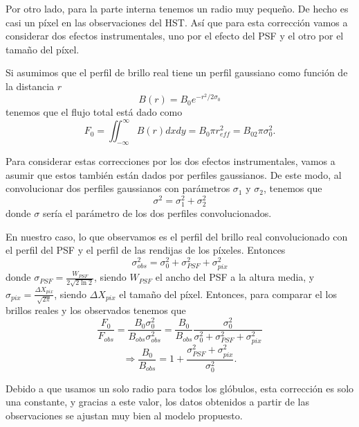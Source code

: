 \documentclass{book}
\begin{document}
Por otro lado, para la parte interna tenemos un radio muy pequeño. De hecho es casi un píxel en las observaciones del HST. Así que para esta corrección vamos a considerar dos efectos instrumentales, uno por el efecto del PSF y el otro por el tamaño del píxel.

Si asumimos que el perfil de brillo real tiene un perfil gaussiano como función de la distancia $r$ 
\begin{equation}
B(r)= B_0 e^{-r^2/2\sigma_0}
\end{equation} 
tenemos que el flujo total está dado como 
\begin{equation}
F_0=\iint_{-\infty}^\infty B(r)dxdy=B_0 \pi r_{eff}^2=B_02\pi \sigma_0^2.
\end{equation}

Para considerar estas correcciones por los dos efectos instrumentales, vamos a asumir que estos también están dados por perfiles gaussianos. De este modo, al convolucionar dos perfiles gaussianos con parámetros $\sigma_1$ y $\sigma_2$, tenemos que 
\begin{equation}
\sigma^2=\sigma_1^2+\sigma_2^2
\end{equation}
donde $\sigma$ sería el parámetro de los dos perfiles convolucionados.

En nuestro caso, lo que observamos es el perfil del brillo real convolucionado con el perfil del PSF y el perfil de las rendijas de los píxeles. Entonces 
\begin{equation}
\sigma_{obs}^2=\sigma_0^2+\sigma_{PSF}^2+\sigma_{pix}^2
\end{equation}
donde $\sigma_{PSF}=\frac{W_{PSF}}{2\sqrt{2\ln{2}}}$, siendo $W_{PSF}$ el ancho del PSF a la altura media, y $\sigma_{pix}=\frac{\Delta X_{pix}}{\sqrt{2\pi}}$, siendo $\Delta X_{pix}$ el tamaño del píxel. Entonces, para comparar el los brillos reales y los observados tenemos que
\begin{equation}
\frac{F_0}{F_{obs}}=\frac{B_0\sigma_0^2}{B_{obs}\sigma_{obs}^2}=\frac{B_0}{B_{obs}}\frac{\sigma_0^2}{\sigma_0^2+\sigma_{PSF}^2+\sigma_{pix}^2}
\end{equation} 
\begin{equation}
\Rightarrow \frac{B_0}{B_{obs}}=1+\frac{\sigma_{PSF}^2+\sigma_{pix}^2}{\sigma_0^2}.
\end{equation}

Debido a que usamos un solo radio para todos los glóbulos, esta corrección es solo una constante, y gracias a este valor, los datos obtenidos a partir de las observaciones se ajustan muy bien al modelo propuesto.
\end{document}
